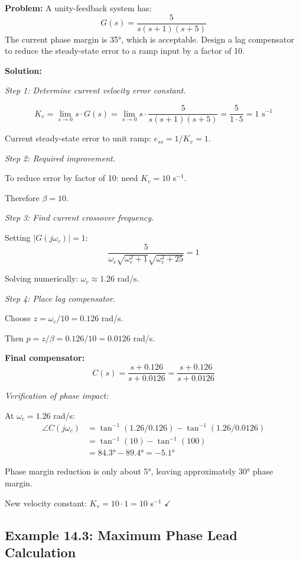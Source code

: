\begin{examplebox}

\textbf{Problem:} A unity-feedback system has:
\[
G(s) = \frac{5}{s(s+1)(s+5)}
\]
The current phase margin is 35°, which is acceptable. Design a lag compensator to reduce the steady-state error to a ramp input by a factor of 10.

\textbf{Solution:}

\textit{Step 1: Determine current velocity error constant.}

\[
K_v = \lim_{s \to 0} s \cdot G(s) = \lim_{s \to 0} s \cdot \frac{5}{s(s+1)(s+5)} = \frac{5}{1 \cdot 5} = 1 \text{ s}^{-1}
\]

Current steady-state error to unit ramp: $e_{ss} = 1/K_v = 1$.

\textit{Step 2: Required improvement.}

To reduce error by factor of 10: need $K_v = 10$ s$^{-1}$.

Therefore $\beta = 10$.

\textit{Step 3: Find current crossover frequency.}

Setting $|G(j\omega_c)| = 1$:
\[
\frac{5}{\omega_c \sqrt{\omega_c^2 + 1} \sqrt{\omega_c^2 + 25}} = 1
\]

Solving numerically: $\omega_c \approx 1.26$ rad/s.

\textit{Step 4: Place lag compensator.}

Choose $z = \omega_c / 10 = 0.126$ rad/s.

Then $p = z/\beta = 0.126/10 = 0.0126$ rad/s.

\textbf{Final compensator:}
\[
\boxed{C(s) = \frac{s + 0.126}{s + 0.0126} = \frac{s + 0.126}{s + 0.0126}}
\]

\textit{Verification of phase impact:}

At $\omega_c = 1.26$ rad/s:
\begin{align}
\angle C(j\omega_c) &= \tan^{-1}(1.26/0.126) - \tan^{-1}(1.26/0.0126) \\
&= \tan^{-1}(10) - \tan^{-1}(100) \\
&= 84.3° - 89.4° = -5.1°
\end{align}

Phase margin reduction is only about 5°, leaving approximately 30° phase margin.

New velocity constant: $K_v = 10 \cdot 1 = 10$ s$^{-1}$ $\checkmark$
\end{examplebox}

\subsection{Example 14.3: Maximum Phase Lead Calculation}

